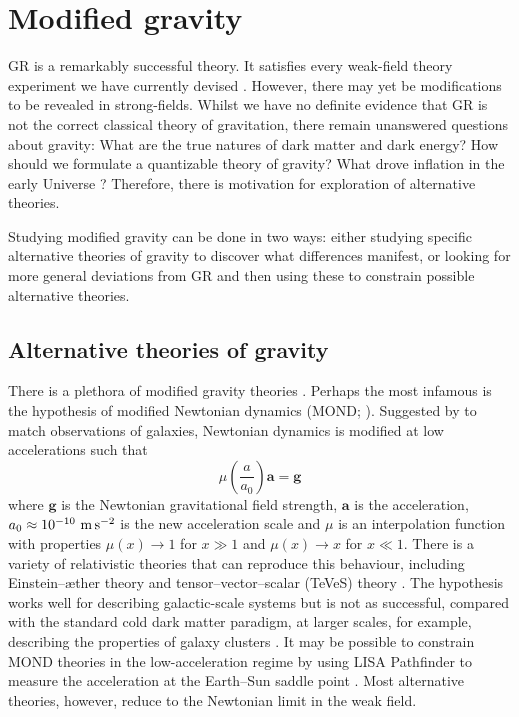 \section{Modified gravity}\label{sec:alternative}

GR is a remarkably successful theory. It satisfies every weak-field theory experiment we have currently devised \citep{Will2006}. However, there may yet be modifications to be revealed in strong-fields. Whilst we have no definite evidence that GR is not the correct classical theory of gravitation, there remain unanswered questions about gravity: What are the true natures of dark matter and dark energy? How should we formulate a quantizable theory of gravity? What drove inflation in the early Universe \citep{Guth1981,Lyth1999}? Therefore, there is motivation for exploration of alternative theories.

Studying modified gravity can be done in two ways: either studying specific alternative theories of gravity to discover what differences manifest, or looking for more general deviations from GR and then using these to constrain possible alternative theories.

\subsection{Alternative theories of gravity}

There is a plethora of modified gravity theories \citep{Clifton2012}. Perhaps the most infamous is the hypothesis of modified Newtonian dynamics (MOND; \citealt{Famaey2012}). Suggested by \citet{Milgrom1983a,Milgrom1983b,Milgrom1983c} to match observations of galaxies, Newtonian dynamics is modified at low accelerations such that
\begin{equation}
\mu\left(\dfrac{a}{a_0}\right)\boldsymbol{a} = \boldsymbol{g}
\end{equation}
where $\boldsymbol{g}$ is the Newtonian gravitational field strength, $\boldsymbol{a}$ is the acceleration, $a_0 \approx 10^{-10}~\mathrm{m\,s^{-2}}$ is the new acceleration scale and $\mu$ is an interpolation function with properties $\mu(x) \rightarrow 1$ for $x \gg 1$ and $\mu(x) \rightarrow x$ for $x \ll 1$. There is a variety of relativistic theories that can reproduce this behaviour, including Einstein--\ae{}ther theory and tensor--vector--scalar (TeVeS) theory \citep{Bekenstein2006}. The hypothesis works well for describing galactic-scale systems but is not as successful, compared with the standard cold dark matter paradigm, at larger scales, for example, describing the properties of galaxy clusters \citep{Aguirre2001,Angus2007}. It may be possible to constrain MOND theories in the low-acceleration regime by using LISA Pathfinder to measure the acceleration at the Earth--Sun saddle point \citep{Magueijo2011,Galianni2011}. Most alternative theories, however, reduce to the Newtonian limit in the weak field.

